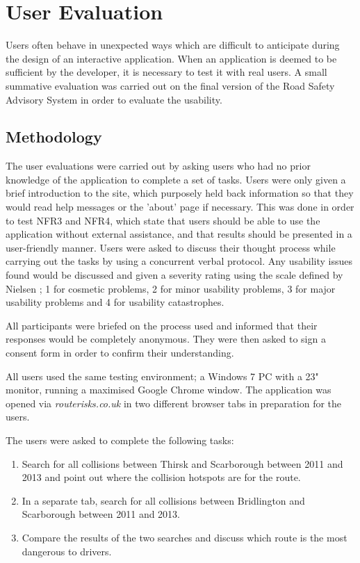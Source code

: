 \documentclass[authoryearcitations]{UoYCSproject}
\begin{document}
\section{User Evaluation}

Users often behave in unexpected ways which are difficult to anticipate during the design of an interactive application. When an application is deemed to be sufficient by the developer, it is necessary to test it with real users. A small summative evaluation was carried out on the final version of the Road Safety Advisory System in order to evaluate the usability. 

\subsection{Methodology}

The user evaluations were carried out by asking users who had no prior knowledge of the application to complete a set of tasks. Users were only given a brief introduction to the site, which purposely held back information so that they would read help messages or the 'about' page if necessary. This was done in order to test NFR3 and NFR4, which state that users should be able to use the application without external assistance, and that results should be presented in a user-friendly manner. Users were asked to discuss their thought process while carrying out the tasks by using a concurrent verbal protocol. Any usability issues found would be discussed and given a severity rating using the scale defined by Nielsen \citep{Nielsen1995}; 1 for cosmetic problems, 2 for minor usability problems, 3 for major usability problems and 4 for usability catastrophes.

All participants were briefed on the process used and informed that their responses would be completely anonymous. They were then asked to sign a consent form in order to confirm their understanding. 

All users used the same testing environment; a Windows 7 PC with a 23" monitor, running a maximised Google Chrome window. The application was opened via \textit{routerisks.co.uk} in two different browser tabs in preparation for the users.

The users were asked to complete the following tasks:

\begin{enumerate}
	\item Search for all collisions between Thirsk and Scarborough between 2011 and 2013 and point out where the collision hotspots are for the route.
	\item In a separate tab, search for all collisions between Bridlington and Scarborough between 2011 and 2013.
	\item Compare the results of the two searches and discuss which route is the most dangerous to drivers.
\end{enumerate}
\end{document}
